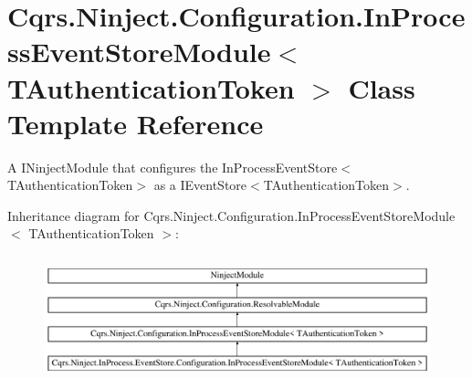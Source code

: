 \hypertarget{classCqrs_1_1Ninject_1_1Configuration_1_1InProcessEventStoreModule}{}\section{Cqrs.\+Ninject.\+Configuration.\+In\+Process\+Event\+Store\+Module$<$ T\+Authentication\+Token $>$ Class Template Reference}
\label{classCqrs_1_1Ninject_1_1Configuration_1_1InProcessEventStoreModule}


A I\+Ninject\+Module that configures the In\+Process\+Event\+Store$<$\+T\+Authentication\+Token$>$ as a I\+Event\+Store$<$\+T\+Authentication\+Token$>$.  


Inheritance diagram for Cqrs.\+Ninject.\+Configuration.\+In\+Process\+Event\+Store\+Module$<$ T\+Authentication\+Token $>$\+:\begin{figure}[H]
\begin{center}
\leavevmode
\includegraphics[height=3.708609cm]{classCqrs_1_1Ninject_1_1Configuration_1_1InProcessEventStoreModule}
\end{center}
\end{figure}
